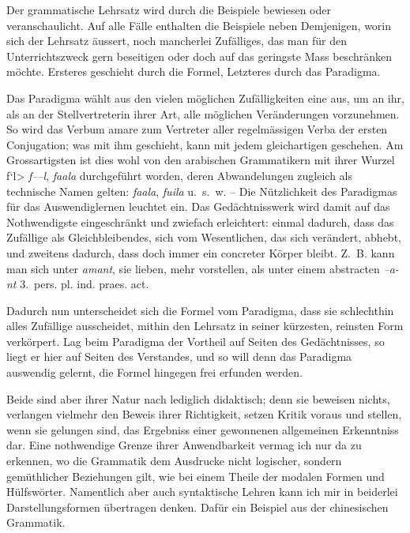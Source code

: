 Der grammatische Lehrsatz wird durch die Beispiele bewiesen oder veranschaulicht. Auf alle Fälle enthalten die Beispiele neben Demjenigen, worin sich \label{sp.117} der Lehrsatz äussert, noch mancherlei Zufälliges, das man für den Unterrichtszweck gern beseitigen oder doch auf das geringste Mass beschränken möchte. Ersteres geschieht durch die Formel, Letzteres durch das Paradigma.

Das Paradigma wählt aus den vielen möglichen Zufälligkeiten eine aus, um an ihr, als an der Stellvertreterin ihrer Art, alle möglichen Veränderungen vorzunehmen. So wird das Verbum amare zum Vertreter aller regelmässigen Verba der ersten Conjugation; was mit ihm geschieht, kann mit jedem gleichartigen geschehen. Am Grossartigsten ist dies wohl von den arabischen Grammatikern mit ihrer Wurzel \<\setarab \novocalize f`l>  \textit{f–{\ain}–l}, \textit{fa{\ain}ala} durchgeführt worden, deren Abwandelungen zugleich als technische Namen gelten:  \textit{fa{\ain}ala},   \textit{fu{\ain}ila} u.~s.~w. – Die Nützlichkeit des Paradigmas für das Auswendiglernen leuchtet ein. Das Gedächtnisswerk wird damit auf das Nothwendigste eingeschränkt und zwiefach erleichtert: einmal dadurch, dass das Zufällige als Gleichbleibendes, sich vom Wesentlichen, das sich verändert, abhebt, und zweitens dadurch, dass doch immer ein concreter Körper bleibt. Z.~B. kann man sich unter \textit{amant}, sie lieben, mehr vorstellen, als unter einem abstracten \textit{–a-nt} 3.~pers. pl. ind. praes. act.

Dadurch nun unterscheidet sich die Formel vom Paradigma, dass sie schlechthin alles Zufällige ausscheidet, mithin den Lehrsatz in seiner kürzesten, reinsten Form verkörpert. Lag beim Paradigma der Vortheil auf Seiten des Gedächtnisses, so liegt er hier auf Seiten des Verstandes, und so will denn das Paradigma auswendig gelernt, die Formel hingegen frei erfunden werden.

Beide sind aber ihrer Natur nach lediglich didaktisch; denn sie beweisen nichts, verlangen vielmehr den Beweis ihrer Richtigkeit, setzen \label{fp.124} Kritik voraus und stellen, wenn sie gelungen sind, das Ergebniss einer gewonnenen allgemeinen Erkenntniss dar. Eine nothwendige Grenze ihrer Anwendbarkeit vermag ich nur da zu erkennen, wo die Grammatik dem Ausdrucke nicht logischer, sondern gemüthlicher Beziehungen gilt, wie bei einem Theile der modalen Formen und Hülfswörter. Namentlich aber auch syntaktische Lehren kann ich mir in beiderlei Darstellungsformen übertragen denken. Dafür ein Beispiel aus der chinesischen Grammatik.

